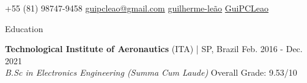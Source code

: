 \documentclass{resume} %
\begin{document}
\vspace{-0.3cm}
\begin{center}
\faMobile
	\hspace{0.1cm}
    +55 (81) 98747-9458
    \hspace{0.2cm}  \hspace{0.2cm}
\faEnvelope
    \hspace{0.1cm}
	\href{mailto:guipcleao@gmail.com}{guipcleao@gmail.com}
    \hspace{0.2cm}  \hspace{0.2cm}
\faLinkedinSquare
	\hspace{0.1cm}
	\href{https://www.linkedin.com/in/guilherme-le\%C3\%A3o}{guilherme-le\~{a}o}
	\hspace{0.2cm}  \hspace{0.2cm}
	\href{https://github.com/GuiPCLeao}{GuiPCLeao}
\end{center}


\begin{rSection}{Education}

{\bf Technological Institute of Aeronautics} (ITA) | SP, Brazil \hfill Feb. 2016 - Dec. 2021
\\ {\em B.Sc in Electronics Engineering (Summa Cum Laude)} \hfill { Overall Grade: 9.53/10}



\end{rSection}
\end{document}

